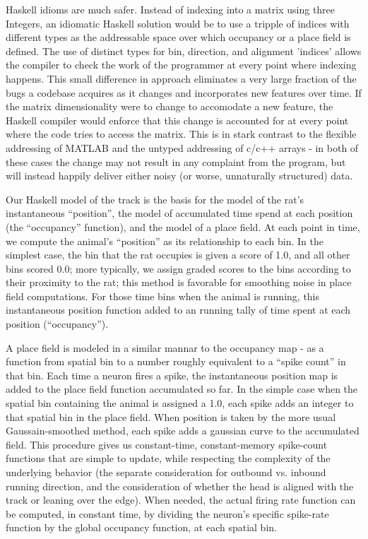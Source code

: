 \documentclass[10pt]{article}
\begin{document}
Haskell idioms are much safer. Instead of indexing into a matrix using three Integers, an idiomatic Haskell solution would be to use a tripple of indices with different types as the addressable space over which occupancy or a place field is defined. The use of distinct types for bin, direction, and alignment 'indices' allows the compiler to check the work of the programmer at every point where indexing happens. This small difference in approach eliminates a very large fraction of the bugs a codebase acquires as it changes and incorporates new features over time. If the matrix dimensionality were to change to accomodate a new feature, the Haskell compiler would enforce that this change is accounted for at every point where the code tries to access the matrix. This is in stark contrast to the flexible addressing of MATLAB and the untyped addressing of c/c++ arrays - in both of these cases the change may not result in any complaint from the program, but will instead happily deliver either noisy (or worse, unnaturally structured) data.

Our Haskell model of the track is the basis for the model of the rat's instantaneous ``position'', the model of accumulated time spend at each position (the ``occupancy'' function), and the model of a place field. At each point in time, we compute the animal's ``position'' as its relationship to each bin. In the simplest case, the bin that the rat occupies is given a score of 1.0, and all other bins scored 0.0; more typically, we assign graded scores to the bins according to their proximity to the rat; this method is favorable for smoothing noise in place field computations. For those time bins when the animal is running, this instantaneous position function added to an running tally of time spent at each position (``occupancy''). 

A place field is modeled in a similar mannar to the occupancy map - as a function from spatial bin to a number roughly equivalent to a ``spike count'' in that bin. Each time a neuron fires a spike, the instantaneous position map is added to the place field function accumulated so far. In the simple case when the spatial bin containing the animal is assigned a 1.0, each spike adds an integer to that spatial bin in the place field. When position is taken by the more usual Gaussain-smoothed method, each spike adds a gaussian curve to the accumulated field. This procedure gives us constant-time, constant-memory spike-count functions that are simple to update, while respecting the complexity of the underlying behavior (the separate consideration for outbound vs. inbound running direction, and the consideration of whether the head is aligned with the track or leaning over the edge). When needed, the actual firing rate function can be computed, in constant time, by dividing the neuron's specific spike-rate function by the global occupancy function, at each spatial bin.
\end{document}
